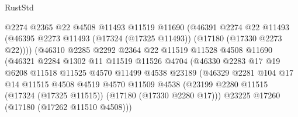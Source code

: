 \begin{lexlean}{RustStd}
\begin{coremodule}
                              @2274
                              @2365
                              @22
                              @4508
                              @11493
                              @11519
                              @11690
                              (@46391
                                @2274
                                @22
                                @11493
                                (@46395
                                  @2273
                                  @11493
                                  (@17324 (@17325 @11493))
                                  (@17180 (@17330 @2273 @22))))
                              (@46310
                                @2285
                                @2292
                                @2364
                                @22
                                @11519
                                @11528
                                @4508
                                @11690
                                (@46321
                                  @2284
                                  @1302
                                  @11
                                  @11519
                                  @11526
                                  @4704
                                  (@46330
                                    @2283
                                    @17
                                    @19
                                    @6208
                                    @11518
                                    @11525
                                    @4570
                                    @11499
                                    @4538
                                    @23189
                                    (@46329
                                      @2281
                                      @104
                                      @17
                                      @14
                                      @11515
                                      @4508
                                      @4519
                                      @4570
                                      @11509
                                      @4538
                                      (@23199
                                        @2280
                                        @11515
                                        (@17324 (@17325 @11515))
                                        (@17180 (@17330 @2280 @17)))
                                      @23225
                                      @17260
                                      (@17180 (@17262 @11510 @4508)))

\end{coremodule}
\end{lexlean}
